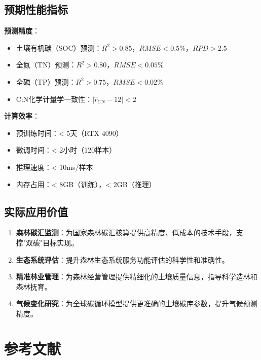\documentclass[12pt, a4paper]{article}
\begin{document}
\subsection{预期性能指标}
\textbf{预测精度}：
\begin{itemize}
    \item 土壤有机碳（SOC）预测：$R^2 > 0.85$，$RMSE < 0.5\%$，$RPD > 2.5$
    \item 全氮（TN）预测：$R^2 > 0.80$，$RMSE < 0.05\%$
    \item 全磷（TP）预测：$R^2 > 0.75$，$RMSE < 0.02\%$
    \item C:N化学计量学一致性：$|\hat{r}_{CN} - 12| < 2$
\end{itemize}

\textbf{计算效率}：
\begin{itemize}
    \item 预训练时间：< 5天（RTX 4090）
    \item 微调时间：< 2小时（120样本）
    \item 推理速度：< 10ms/样本
    \item 内存占用：< 8GB（训练），< 2GB（推理）
\end{itemize}

\subsection{实际应用价值}
\begin{enumerate}
    \item \textbf{森林碳汇监测}：为国家森林碳汇核算提供高精度、低成本的技术手段，支撑"双碳"目标实现。
    \item \textbf{生态系统评估}：提升森林生态系统服务功能评估的科学性和准确性。
    \item \textbf{精准林业管理}：为森林经营管理提供精细化的土壤质量信息，指导科学造林和森林抚育。
    \item \textbf{气候变化研究}：为全球碳循环模型提供更准确的土壤碳库参数，提升气候预测精度。
\end{enumerate}

\newpage
\section{参考文献}
\end{document}
